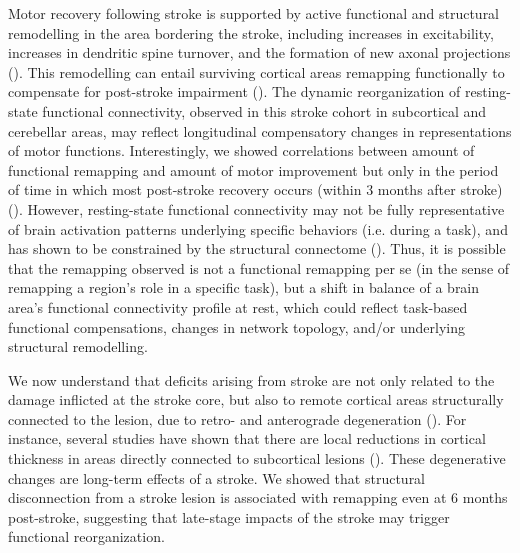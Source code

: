 \documentclass[phd,tocprelim]{cornell}
\begin{document}
    Motor recovery following stroke is supported by active functional and structural remodelling in the area bordering the stroke, including increases in excitability, increases in dendritic spine turnover, and the formation of new axonal projections (\cite{Murphy2009-ez}). This remodelling can entail surviving cortical areas remapping functionally to compensate for post-stroke impairment (\cite{Brown2009-jn}). The dynamic reorganization of resting-state functional connectivity, observed in this stroke cohort in subcortical and cerebellar areas, may reflect longitudinal compensatory changes in representations of motor functions. Interestingly, we showed correlations between amount of functional remapping and amount of motor improvement but only in the period of time in which most post-stroke recovery occurs (within 3 months after stroke) (\cite{Lee2015-nn}). However, resting-state functional connectivity may not be fully representative of brain activation patterns underlying specific behaviors (i.e. during a task), and has shown to be constrained by the structural connectome (\cite{Kuceyeski2019-gt, Honey2009-xb}). Thus, it is possible that the remapping observed is not a functional remapping per se (in the sense of remapping a region's role in a specific task), but a shift in balance of a brain area's functional connectivity profile at rest, which could reflect task-based functional compensations, changes in network topology, and/or underlying structural remodelling. 

	We now understand that deficits arising from stroke are not only related to the damage inflicted at the stroke core, but also to remote cortical areas structurally connected to the lesion, due to retro- and anterograde degeneration (\cite{Guggisberg2019-lj}). For instance, several studies have shown that there are local reductions in cortical thickness in areas directly connected to subcortical lesions (\cite{Duering2015-iv, Cheng2015-jq}). These degenerative changes are long-term effects of a stroke. We showed that structural disconnection from a stroke lesion is associated with remapping even at 6 months post-stroke, suggesting that late-stage impacts of the stroke may trigger functional reorganization. 
    
\end{document}
